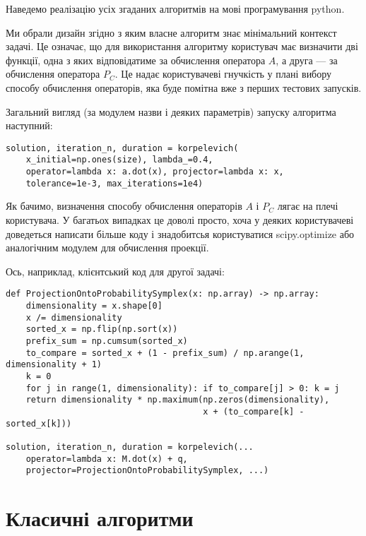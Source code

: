 Наведемо реалізацію усіх згаданих алгоритмів на мові програмування python.

\begin{remark}
    Ми обрали дизайн згідно з яким власне алгоритм знає мінімальний контекст задачі. Це означає, що для використання алгоритму користувач має визначити дві функції, одна з яких відповідатиме за обчислення оператора $A$, а друга --- за обчислення оператора $P_C$. Це надає користувачеві гнучкість у плані вибору способу обчислення операторів, яка буде помітна вже з перших тестових запусків.
\end{remark}

Загальний вигляд (за модулем назви і деяких параметрів) запуску алгоритма наступний:
\begin{verbatim}
solution, iteration_n, duration = korpelevich(
    x_initial=np.ones(size), lambda_=0.4,
    operator=lambda x: a.dot(x), projector=lambda x: x,
    tolerance=1e-3, max_iterations=1e4)
\end{verbatim}

Як бачимо, визначення способу обчислення операторів $A$ і $P_C$ лягає на плечі користувача. У багатьох випадках це доволі просто, хоча у деяких користувачеві доведеться написати більше коду і знадобитсья користуватися scipy.optimize або  аналогічним модулем для обчислення проекції. \medskip

Ось, наприклад, клієнтський код для другої задачі:

\begin{verbatim}
def ProjectionOntoProbabilitySymplex(x: np.array) -> np.array:
    dimensionality = x.shape[0]
    x /= dimensionality
    sorted_x = np.flip(np.sort(x))
    prefix_sum = np.cumsum(sorted_x)
    to_compare = sorted_x + (1 - prefix_sum) / np.arange(1, dimensionality + 1)
    k = 0
    for j in range(1, dimensionality): if to_compare[j] > 0: k = j
    return dimensionality * np.maximum(np.zeros(dimensionality),
                                       x + (to_compare[k] - sorted_x[k]))

solution, iteration_n, duration = korpelevich(...
    operator=lambda x: M.dot(x) + q,
    projector=ProjectionOntoProbabilitySymplex, ...)
\end{verbatim}

\newpage
\section{Класичні алгоритми}


